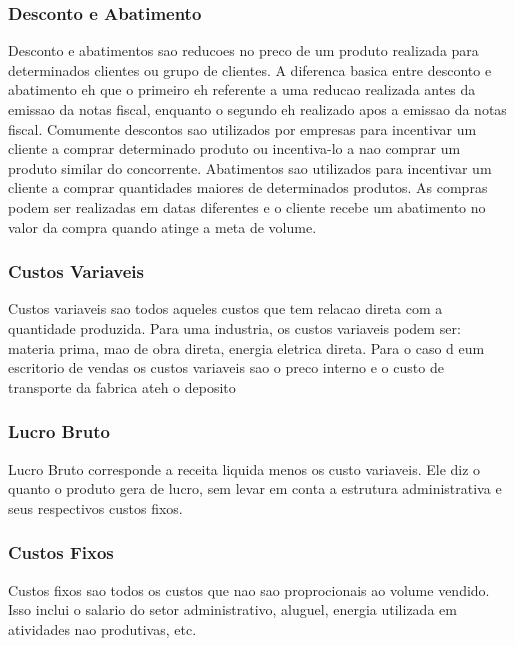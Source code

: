 \documentclass[12pt]{article}
\begin{document}
\subsubsection{Desconto e Abatimento}
Desconto e abatimentos sao reducoes no preco de um produto realizada para determinados clientes ou grupo de clientes. A diferenca basica entre desconto e abatimento eh que o primeiro eh referente a uma reducao realizada antes da emissao da notas fiscal, enquanto o segundo eh realizado apos a emissao da notas fiscal. Comumente descontos sao utilizados por empresas para incentivar um cliente a comprar determinado produto ou incentiva-lo a nao comprar um produto similar do concorrente. Abatimentos sao utilizados para incentivar um cliente a comprar quantidades maiores de determinados produtos. As compras podem ser realizadas em datas diferentes e o cliente recebe um abatimento no valor da compra quando atinge a meta de volume.

\subsubsection{Custos Variaveis}
Custos variaveis sao todos aqueles custos que tem relacao direta com a quantidade produzida. Para uma industria, os custos variaveis podem ser: materia prima, mao de obra direta, energia eletrica direta. Para o caso d eum escritorio de vendas os custos variaveis sao o preco interno e o custo de transporte da fabrica ateh o deposito

\subsubsection{Lucro Bruto}
Lucro Bruto corresponde a receita liquida menos os custo variaveis. Ele diz o quanto o produto gera de lucro, sem levar em conta a estrutura administrativa e seus respectivos custos fixos.

\subsubsection{Custos Fixos}
Custos fixos sao todos os custos que nao sao proprocionais ao volume vendido. Isso inclui o salario do setor administrativo, aluguel, energia utilizada em atividades nao produtivas, etc.
\end{document}

